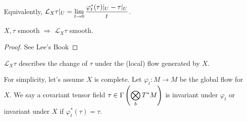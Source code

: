 Equivalently,  $ \displaystyle\mathcal{L}_X\tau|_U=\lim_{t\to 0}\frac{\varphi_t^*(\tau)|_U-\tau|_U}{t} $.

\begin{lemma}
     $ X,\tau  $ smooth  $ \Rightarrow $  $ \mathcal{L}_X\tau  $ smooth. 
\end{lemma}
\begin{proof}
    See Lee's Book
\end{proof}
 $ \mathcal{L}_X\tau $ describes the change of  $ \tau  $ under the (local) flow generated by  $ X $.
 
 For simplicity, let's assume  $ X  $ is complete. Let  $ \varphi_t:M\rightarrow M $ be the global flow for  $ X $. We say a covariant tensor field  $ \tau\in \Gamma\left(\displaystyle\bigotimes_b T^*M\right) $ is invariant under  $ \varphi_t $ or invariant under  $ X  $ if  $ \varphi_t^*(\tau)=\tau $.
 
